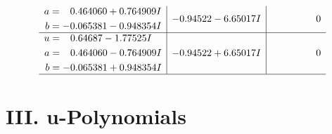 \documentclass[1p]{elsarticle_modified}
\theoremstyle{definition}
\begin{document}
$$\begin{array}{c|c|c}
\begin{aligned}
a &= \phantom{-}0.464060 + 0.764909 I \\
b &= -0.065381 - 0.948354 I\end{aligned}
 & -0.94522 - 6.65017 I & \phantom{-0.000000 } 0 \\ \hline\begin{aligned}
u &= \phantom{-}0.64687 - 1.77525 I \\
a &= \phantom{-}0.464060 - 0.764909 I \\
b &= -0.065381 + 0.948354 I\end{aligned}
 & -0.94522 + 6.65017 I & \phantom{-0.000000 } 0\\
 \hline 
 \end{array}$$\newpage
\newpage\renewcommand{\arraystretch}{1}
\centering \section*{ III. u-Polynomials}
\end{document}
